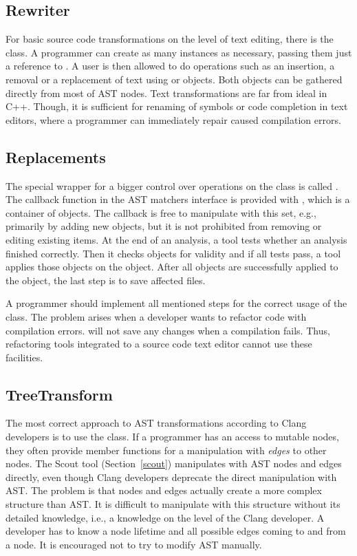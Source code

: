 \subsection{Rewriter}
For basic source code transformations on the level of text editing, there is the  class. A programmer can create as many instances as necessary, passing them just a reference to . A user is then allowed to do operations such as an insertion, a removal or a replacement of text using  or  objects. Both objects can be gathered directly from most of AST nodes. Text transformations are far from ideal in C++. Though, it is sufficient for renaming of symbols or code completion in text editors, where a programmer can immediately repair caused compilation errors.

\subsection{Replacements}
The special wrapper for a bigger control over operations on the  class is called  . The callback function in the AST matchers interface is provided with , which is a container of  objects. The callback is free to manipulate with this set, e.g., primarily by adding new objects, but it is not prohibited from removing or editing existing items. At the end of an analysis, a tool tests whether an analysis finished correctly. Then it checks  objects for validity and if all tests pass, a tool applies those objects on the  object. After all  objects are successfully applied to the  object, the last step is to save affected files.

A programmer should implement all mentioned steps for the correct usage of the  class. The problem arises when a developer wants to refactor code with compilation errors.  will not save any changes when a compilation fails. Thus, refactoring tools integrated to a source code text editor cannot use these facilities.

\subsection{TreeTransform}
\label{treetransform}
The most correct approach to AST transformations according to Clang developers is to use the  class. If a programmer has an access to mutable nodes, they often provide member functions for a manipulation with \textit{edges} to other nodes. The Scout tool (Section~\ref{scout}) manipulates with AST nodes and edges directly, even though Clang developers deprecate the direct manipulation with AST. The problem is that nodes and edges actually create a more complex structure than AST. It is difficult to manipulate with this structure without its detailed knowledge, i.e., a knowledge on the level of the Clang developer. A developer has to know a node lifetime and all possible edges coming to and from a node. It is encouraged not to try to modify AST manually.

